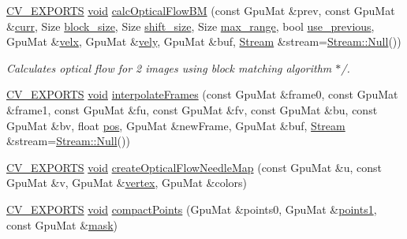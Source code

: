 \begin{DoxyCompactItemize}
\hyperlink{core_2types__c_8h_a1bf9f0e121b54272da02379cfccd0a2b}{C\-V\-\_\-\-E\-X\-P\-O\-R\-T\-S} \hyperlink{legacy_8hpp_a8bb47f092d473522721002c86c13b94e}{void} \hyperlink{namespacecv_1_1gpu_a4e6c34a3207ab7ab50081f01bf843227}{calc\-Optical\-Flow\-B\-M} (const Gpu\-Mat \&prev, const Gpu\-Mat \&\hyperlink{tracking_8hpp_a017ed49f5dd5b9919fe8abdc0e628d1a}{curr}, Size \hyperlink{legacy_8hpp_a4a214ca6e8ee1d4806c28a2fe5b4c8e1}{block\-\_\-size}, Size \hyperlink{legacy_8hpp_aa973f16cc51ceb4ef9a209ef85dcd3fb}{shift\-\_\-size}, Size \hyperlink{legacy_8hpp_a0327a8c849dfab37a441b7ea161d1524}{max\-\_\-range}, bool \hyperlink{legacy_8hpp_aa48cd04197214726a4f5a38d24bb46a5}{use\-\_\-previous}, Gpu\-Mat \&\hyperlink{legacy_8hpp_a1b49096cb71c0abeb119c1cfd84f67a0}{velx}, Gpu\-Mat \&\hyperlink{legacy_8hpp_a30c79734bbfc20fc3b31ac62e1431f21}{vely}, Gpu\-Mat \&buf, \hyperlink{classcv_1_1gpu_1_1Stream}{Stream} \&stream=\hyperlink{classcv_1_1gpu_1_1Stream_af96c23564834f88333dcb8997df553f1}{Stream\-::\-Null}())
\begin{DoxyCompactList}\small\item\em Calculates optical flow for 2 images using block matching algorithm $\ast$/. \end{DoxyCompactList}\item 
\hyperlink{core_2types__c_8h_a1bf9f0e121b54272da02379cfccd0a2b}{C\-V\-\_\-\-E\-X\-P\-O\-R\-T\-S} \hyperlink{legacy_8hpp_a8bb47f092d473522721002c86c13b94e}{void} \hyperlink{namespacecv_1_1gpu_aaf2bd7135aecc1c566c9bcdb5be5e1f2}{interpolate\-Frames} (const Gpu\-Mat \&frame0, const Gpu\-Mat \&frame1, const Gpu\-Mat \&fu, const Gpu\-Mat \&fv, const Gpu\-Mat \&bu, const Gpu\-Mat \&bv, float \hyperlink{highgui__c_8h_a2eaacae6060d194f31eafce8ca3c09dd}{pos}, Gpu\-Mat \&new\-Frame, Gpu\-Mat \&buf, \hyperlink{classcv_1_1gpu_1_1Stream}{Stream} \&stream=\hyperlink{classcv_1_1gpu_1_1Stream_af96c23564834f88333dcb8997df553f1}{Stream\-::\-Null}())
\item 
\hyperlink{core_2types__c_8h_a1bf9f0e121b54272da02379cfccd0a2b}{C\-V\-\_\-\-E\-X\-P\-O\-R\-T\-S} \hyperlink{legacy_8hpp_a8bb47f092d473522721002c86c13b94e}{void} \hyperlink{namespacecv_1_1gpu_afbca1952f714fe4cd1a9b7a99c71dd8e}{create\-Optical\-Flow\-Needle\-Map} (const Gpu\-Mat \&u, const Gpu\-Mat \&v, Gpu\-Mat \&\hyperlink{legacy_8hpp_ac8a106041f9639c956b255212cfe857e}{vertex}, Gpu\-Mat \&colors)
\item 
\hyperlink{core_2types__c_8h_a1bf9f0e121b54272da02379cfccd0a2b}{C\-V\-\_\-\-E\-X\-P\-O\-R\-T\-S} \hyperlink{legacy_8hpp_a8bb47f092d473522721002c86c13b94e}{void} \hyperlink{namespacecv_1_1gpu_a8c44a7a4fdb16ee4ab5f88d508e39e3b}{compact\-Points} (Gpu\-Mat \&points0, Gpu\-Mat \&\hyperlink{calib3d_8hpp_a3b72d48e58a35993385885cbc187c91d}{points1}, const Gpu\-Mat \&\hyperlink{tracking_8hpp_a6b13ecd2fd6ec7ad422f1d7863c3ad19}{mask})

\end{DoxyCompactItemize}

